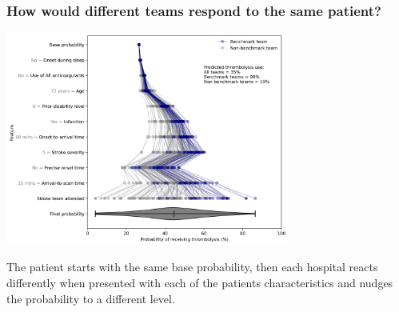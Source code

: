 \begin{frame}
\frametitle{How would different teams respond to the same patient?}

    \begin{center}
    \includegraphics[width=0.7\textwidth]{./images/21_shap_waterfall_with_violin_contentious.jpg}
    \end{center}

\footnotesize The patient starts with the same base probability, then each hospital reacts differently when presented with each of the patients characteristics and nudges the probability to a different level.

\end{frame}

